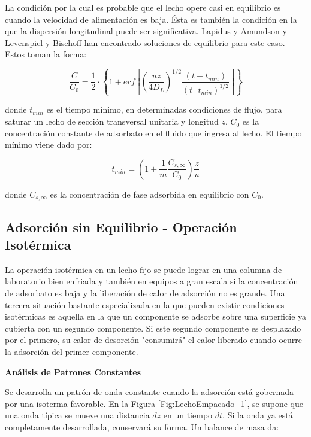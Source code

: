 \documentclass[11pt]{book}
\begin{document}
La condición por la cual es probable que el lecho opere casi en equilibrio es cuando la velocidad de alimentación es baja. Ésta es también la condición en la que la dispersión longitudinal puede ser significativa. Lapidus y Amundson y Levenspiel y Bischoff han encontrado soluciones de equilibrio para este caso. Estos toman la forma:

\begin{equation}
    \label{eq:BalanceMasaAdsorcion_9}
    \frac{C}{C_0} = \frac{1}{2} \cdot \left\{ 1 + erf\left[ \left( \frac{u z}{4 D_L} \right)^{1/2} \frac{(t-t_{min})}{(t\textrm{ } t_{min})^{1/2}} \right] \right\}
\end{equation}

donde $t_{min}$ es el tiempo mínimo, en determinadas condiciones de flujo, para saturar un lecho de sección transversal unitaria y longitud $z$. $C_0$ es la concentración constante de adsorbato en el fluido que ingresa al lecho. El tiempo mínimo viene dado por:

\begin{equation}
    \label{eq:BalanceMasaAdsorcion_10}
    t_{min} = \left( 1 + \frac{1}{m} \frac{C_{s, \infty}}{C_0} \right) \frac{z}{u}
\end{equation}

donde $C_{s, \infty}$ es la concentración de fase adsorbida en equilibrio con $C_0$. 

\subsection{Adsorción sin Equilibrio - Operación Isotérmica}

La operación isotérmica en un lecho fijo se puede lograr en una columna de laboratorio bien enfriada y también en equipos a gran escala si la concentración de adsorbato es baja y la liberación de calor de adsorción no es grande. Una tercera situación bastante especializada en la que pueden existir condiciones isotérmicas es aquella en la que un componente se adsorbe sobre una superficie ya cubierta con un segundo componente. Si este segundo componente es desplazado por el primero, su calor de desorción "consumirá" el calor liberado cuando ocurre la adsorción del primer componente.

\textbf{Análisis de Patrones Constantes}

Se desarrolla un patrón de onda constante cuando la adsorción está gobernada por una isoterma favorable. En la Figura \ref{Fig:LechoEmpacado_1}, se supone que una onda típica se mueve una distancia $dz$ en un tiempo $dt$. Si la onda ya está completamente desarrollada, conservará su forma. Un balance de masa da:
\end{document}

